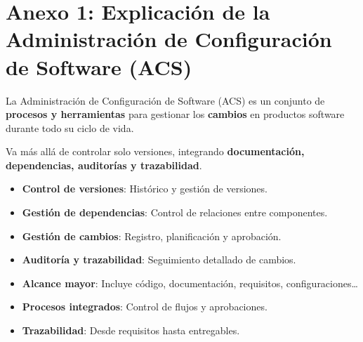 \documentclass[a4paper,11pt]{report}
\begin{document}
    \clearpage


    \section*{Anexo 1: Explicación de la Administración de Configuración de Software (ACS)}

    \begin{multicols}{2}

        \begin{cajaazul}
            La Administración de Configuración de Software (ACS) es un conjunto de \textbf{procesos y herramientas} para gestionar los \textbf{cambios} en productos software durante todo su ciclo de vida.

            Va más allá de controlar solo versiones, integrando \textbf{documentación, dependencias, auditorías y trazabilidad}.
        \end{cajaazul}

        \vspace{0.5em}

        \begin{cajaverde}
            \begin{itemize}[leftmargin=*]
                \item \textbf{Control de versiones}: Histórico y gestión de versiones.
                \item \textbf{Gestión de dependencias}: Control de relaciones entre componentes.
                \item \textbf{Gestión de cambios}: Registro, planificación y aprobación.
                \item \textbf{Auditoría y trazabilidad}: Seguimiento detallado de cambios.
            \end{itemize}
        \end{cajaverde}

        \vspace{0.5em}
        \deactivatequoting
        \begin{cajanaranja}
            \begin{itemize}[leftmargin=*]
                \item \textbf{Alcance mayor}: Incluye código, documentación, requisitos, configuraciones\ldots
                \item \textbf{Procesos integrados}: Control de flujos y aprobaciones.
                \item \textbf{Trazabilidad}: Desde requisitos hasta entregables.
            \end{itemize}
        \end{cajanaranja}
        \activatequoting
        \vspace{0.5em}


\end{multicols}
\end{document}
